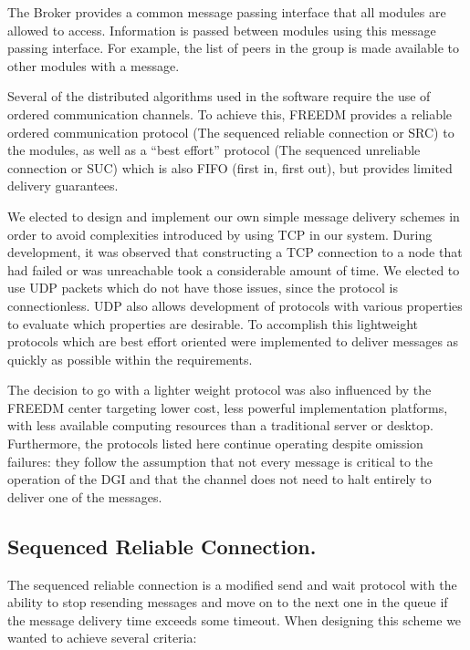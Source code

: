 The Broker provides a common message passing interface that all modules are allowed to access. Information is passed between modules using this message passing interface. For example, the list of peers in the group is made available to other modules with a message.

Several of the distributed algorithms used in the software require the use of ordered communication channels. To achieve this, FREEDM provides a reliable ordered communication protocol (The sequenced reliable connection or SRC) to the modules, as well as a ``best effort'' protocol (The sequenced unreliable connection or SUC) which is also FIFO (first in, first out), but provides limited delivery guarantees.

We elected to design and implement our own simple message delivery schemes in order to avoid complexities introduced by using TCP in our system. During development, it was observed that constructing a TCP connection to a node that had failed or was unreachable took a considerable amount of time. We elected to use UDP packets which do not have those issues, since the protocol is connectionless. UDP also allows development of protocols with various properties to evaluate which properties are desirable. To accomplish this lightweight protocols which are best effort oriented were implemented to deliver messages as quickly as possible within the requirements.

The decision to go with a lighter weight protocol was also influenced by the FREEDM center targeting lower cost, less powerful implementation platforms, with less available computing resources than a traditional server or desktop. Furthermore, the protocols listed here continue operating despite omission failures: they follow the assumption that not every message is critical to the operation of the DGI and that the channel does not need to halt entirely to deliver one of the messages.

\subsection{Sequenced Reliable Connection.}

The sequenced reliable connection is a modified send and wait protocol with the ability to stop resending messages and move on to the next one in the queue if the message delivery time exceeds some timeout. When designing this scheme we wanted to achieve several criteria:

